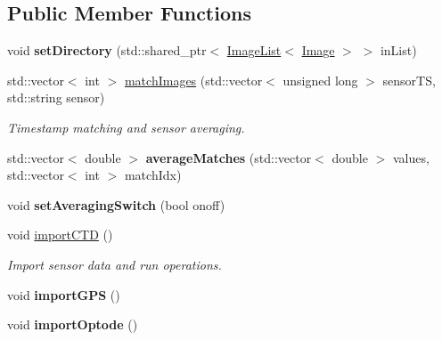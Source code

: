 \subsection*{Public Member Functions}
\begin{DoxyCompactItemize}
\item 
void {\bfseries set\+Directory} (std\+::shared\+\_\+ptr$<$ \hyperlink{classImageList}{Image\+List}$<$ \hyperlink{classImage}{Image} $>$ $>$ in\+List)\hypertarget{classSensorMelt_a2783557000c9d3b4036e57216ea6e09f}{}\label{classSensorMelt_a2783557000c9d3b4036e57216ea6e09f}

\item 
std\+::vector$<$ int $>$ \hyperlink{classSensorMelt_aa2270d366f5c6aa6e0aadae79cd93d4c}{match\+Images} (std\+::vector$<$ unsigned long $>$ sensor\+TS, std\+::string sensor)\hypertarget{classSensorMelt_aa2270d366f5c6aa6e0aadae79cd93d4c}{}\label{classSensorMelt_aa2270d366f5c6aa6e0aadae79cd93d4c}

\begin{DoxyCompactList}\small\item\em Timestamp matching and sensor averaging. \end{DoxyCompactList}\item 
std\+::vector$<$ double $>$ {\bfseries average\+Matches} (std\+::vector$<$ double $>$ values, std\+::vector$<$ int $>$ match\+Idx)\hypertarget{classSensorMelt_ad40955991df6c51ea6b67232d6965bb2}{}\label{classSensorMelt_ad40955991df6c51ea6b67232d6965bb2}

\item 
void {\bfseries set\+Averaging\+Switch} (bool onoff)\hypertarget{classSensorMelt_a9d29e0629225037b657e5d8834dd5368}{}\label{classSensorMelt_a9d29e0629225037b657e5d8834dd5368}

\item 
void \hyperlink{classSensorMelt_a7f336a1b250a6bf3dc20056d0b336a70}{import\+C\+TD} ()\hypertarget{classSensorMelt_a7f336a1b250a6bf3dc20056d0b336a70}{}\label{classSensorMelt_a7f336a1b250a6bf3dc20056d0b336a70}

\begin{DoxyCompactList}\small\item\em Import sensor data and run operations. \end{DoxyCompactList}\item 
void {\bfseries import\+G\+PS} ()\hypertarget{classSensorMelt_a343783897c3bbf188a207952b06eb6ce}{}\label{classSensorMelt_a343783897c3bbf188a207952b06eb6ce}

\item 
void {\bfseries import\+Optode} ()\hypertarget{classSensorMelt_a188ed30ee1d6f41058b94e7d13b9f530}{}\label{classSensorMelt_a188ed30ee1d6f41058b94e7d13b9f530}


\end{DoxyCompactItemize}

